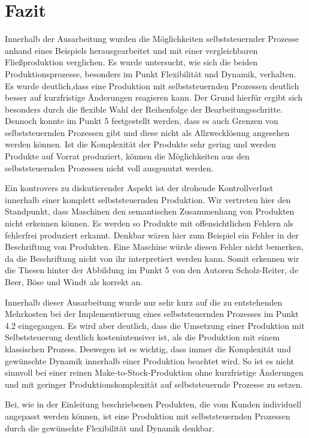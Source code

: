 \section{Fazit}
\label{sec:Fazit}

Innerhalb der Ausarbeitung wurden die Möglichkeiten selbststeuernder Prozesse
anhand eines Beispiels herausgearbeitet und mit einer vergleichbaren
Fließproduktion verglichen. Es wurde untersucht, wie sich die beiden
Produktionsprozesse, besonders im Punkt Flexibilität und Dynamik, verhalten. Es
wurde deutlich,dass eine Produktion mit selbststeuernden Prozessen deutlich
besser auf kurzfristige Änderungen reagieren kann. Der Grund hierfür ergibt
sich besonders durch die flexible Wahl der Reihenfolge der
Bearbeitungsschritte. Dennoch konnte im Punkt 5 festgestellt werden, dass es
auch Grenzen von selbststeuernden Prozessen gibt und diese nicht als
Allzwecklösung angesehen werden können. Ist die Komplexität der Produkte sehr
gering und werden Produkte auf Vorrat produziert, können die Möglichkeiten aus
den selbststeuernden Prozessen nicht voll ausgenutzt werden.

Ein kontrovers zu diskutierender Aspekt ist der drohende Kontrollverlust
innerhalb einer komplett selbststeuernden Produktion. Wir vertreten hier den
Standpunkt, dass Maschinen den semantischen Zusammenhang von Produkten nicht
erkennen können. Es werden so Produkte mit offensichtlichen Fehlern als
fehlerfrei produziert erkannt. Denkbar wären hier zum Beispiel ein Fehler in
der Beschriftung von Produkten. Eine Maschine würde diesen Fehler nicht
bemerken, da die Beschriftung nicht von ihr interpretiert werden kann. Somit
erkennen wir die Thesen hinter der Abbildung im Punkt 5 von den Autoren
Scholz-Reiter, de Beer, Böse und Windt als korrekt an.

Innerhalb dieser Ausarbeitung wurde nur sehr kurz auf die zu entstehenden
Mehrkosten bei der Implementierung eines selbststeuernden Prozesses im Punkt
4.2 eingegangen. Es wird aber deutlich, dass die Umsetzung einer Produktion mit
Selbststeuerung deutlich kostenintensiver ist, als die Produktion mit einem
klassischen Prozess. Deswegen ist es wichtig, dass immer die Komplexität und
gewünschte Dynamik innerhalb einer Produktion beachtet wird. So ist es nicht
sinnvoll bei einer reinen Make-to-Stock-Produktion ohne kurzfristige Änderungen
und mit geringer Produktionskomplexität auf selbststeuernde Prozesse zu setzen.

Bei, wie in der Einleitung beschriebenen Produkten, die vom Kunden individuell
angepasst werden können, ist eine Produktion mit selbststeuernden Prozessen
durch die gewünschte Flexibilität und Dynamik denkbar.

